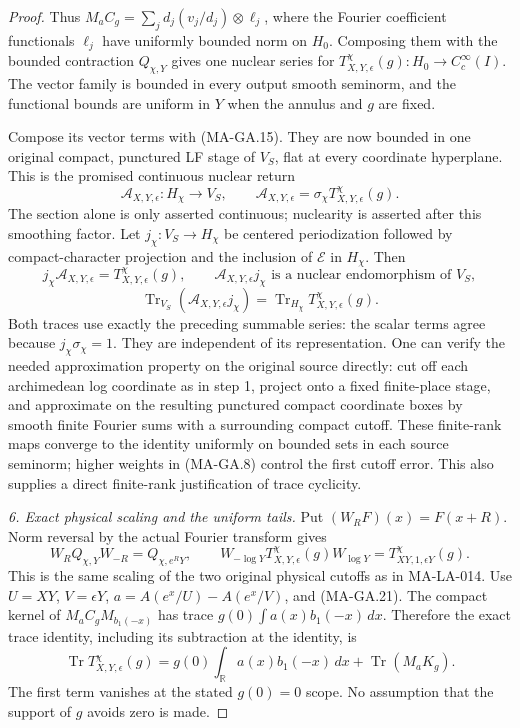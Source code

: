 \begin{proof}
Thus $M_aC_g=\sum_jd_j(v_j/d_j)\otimes\ell_j$, where
the Fourier coefficient functionals $\ell_j$ have
uniformly bounded norm on $H_0$.  Composing them with
the bounded contraction $Q_{\chi,Y}$ gives one nuclear
series for $T^\chi_{X,Y,\epsilon}(g):H_0\to C_c^\infty(I)$.
The vector family is bounded in every output smooth
seminorm, and the functional bounds are uniform in $Y$
when the annulus and $g$ are fixed.

Compose its vector terms with (MA-GA.15).  They are now
bounded in one original compact, punctured LF stage of
$V_S$, flat at every coordinate hyperplane.  This is
the promised continuous nuclear return
\[
 \mathcal A_{X,Y,\epsilon}:H_\chi\longrightarrow V_S,
       \qquad \mathcal A_{X,Y,\epsilon}
                         =\sigma_\chi T^\chi_{X,Y,\epsilon}(g).
 \tag{MA-GA.27}
\]
The section alone is only asserted continuous; nuclearity
is asserted after this smoothing factor.  Let
$j_\chi:V_S\to H_\chi$ be centered periodization followed
by compact-character projection and the inclusion of
$\mathcal E$ in $H_\chi$.  Then
\[
 j_\chi\mathcal A_{X,Y,\epsilon}
            =T^\chi_{X,Y,\epsilon}(g),\qquad
 \mathcal A_{X,Y,\epsilon}j_\chi
          \text{ is a nuclear endomorphism of }V_S,
\]
\[
 \operatorname{Tr}_{V_S}(\mathcal A_{X,Y,\epsilon}j_\chi)
          =\operatorname{Tr}_{H_\chi}T^\chi_{X,Y,\epsilon}(g).
 \tag{MA-GA.28}
\]
Both traces use exactly the preceding summable series:
the scalar terms agree because $j_\chi\sigma_\chi=1$.
They are independent of its representation.  One can
verify the needed approximation property on the original
source directly: cut off each archimedean log coordinate
as in step 1, project onto a fixed finite-place stage,
and approximate on the resulting punctured compact
coordinate boxes by smooth finite Fourier sums with
a surrounding compact cutoff.  These finite-rank maps
converge to the identity uniformly on bounded sets in
each source seminorm; higher weights in (MA-GA.8)
control the first cutoff error.  This also supplies a
direct finite-rank justification of trace cyclicity.

\emph{6. Exact physical scaling and the uniform tails.}
Put $(W_RF)(x)=F(x+R)$.  Norm reversal by the actual
Fourier transform gives
\[
 W_RQ_{\chi,Y}W_{-R}=Q_{\chi,e^RY},\qquad
 W_{-\log Y}T^\chi_{X,Y,\epsilon}(g)W_{\log Y}
                       =T^\chi_{XY,1,\epsilon Y}(g).
 \tag{MA-GA.29}
\]
This is the same scaling of the two original physical
cutoffs as in MA-LA-014.  Use $U=XY$, $V=\epsilon Y$,
$a=A(e^x/U)-A(e^x/V)$, and (MA-GA.21).  The compact
kernel of $M_aC_gM_{b_1(-x)}$ has trace
$g(0)\int a(x)b_1(-x)\,dx$.  Therefore the exact trace
identity, including its subtraction at the identity, is
\[
 \operatorname{Tr}T^\chi_{X,Y,\epsilon}(g)
     =g(0)\int_{\mathbb R}a(x)b_1(-x)\,dx
                         +\operatorname{Tr}(M_aK_g).
 \tag{MA-GA.30}
\]
The first term vanishes at the stated $g(0)=0$ scope.
No assumption that the support of $g$ avoids zero is made.


\end{proof}
